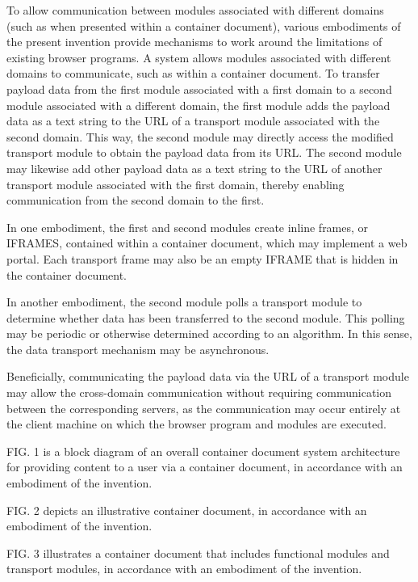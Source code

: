 \summary

To allow communication
between modules associated with different domains (such as when
presented within a container document), various embodiments of the
present invention provide mechanisms to work around the limitations of
existing browser programs. A system allows modules associated with
different domains to communicate, such as within a container
document. To transfer payload data from the first module associated
with a first domain to a second module associated with a different
domain, the first module adds the payload data as a text string to the
URL of a transport module associated with the second domain. This way,
the second module may directly access the modified transport module to
obtain the payload data from its URL. The second module may likewise
add other payload data as a text string to the URL of another
transport module associated with the first domain, thereby enabling
communication from the second domain to the first.

In one embodiment, the first and second modules create
inline frames, or IFRAMES, contained within a container document,
which may implement a web portal. Each transport frame may also be an
empty IFRAME that is hidden in the container document.

In another embodiment, the second module polls a transport
module to determine whether data has been transferred to the second
module. This polling may be periodic or otherwise determined according
to an algorithm. In this sense, the data transport mechanism may be
asynchronous.

Beneficially, communicating the
payload data via the URL of a transport module may allow the
cross-domain communication without requiring communication between the
corresponding servers, as the communication may occur entirely at the
client machine on which the browser program and modules are
executed.

\drawings

FIG. 1 is a block diagram of an overall container document
system architecture for providing content to a user via a container
document, in accordance with an embodiment of the invention.

FIG. 2 depicts an illustrative container
document, in accordance with an embodiment of the invention.

FIG. 3 illustrates a container document that
includes functional modules and transport modules, in accordance with
an embodiment of the invention.

